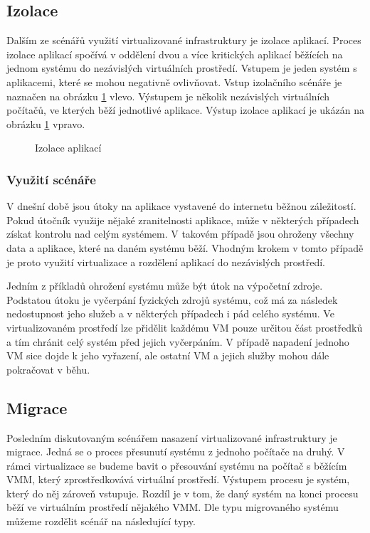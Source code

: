 \subsection{Izolace}

Dalším ze scénářů využití virtualizované infrastruktury je izolace aplikací. Proces izolace aplikací spočívá v oddělení dvou a více kritických aplikací běžících na jednom systému do nezávislých virtuálních prostředí.
Vstupem je jeden systém s aplikacemi, které se mohou negativně ovlivňovat. Vstup izolačního scénáře je naznačen na obrázku \ref{izolation} vlevo. Výstupem je několik nezávislých virtuálních počítačů, ve kterých běží
jednotlivé aplikace. Výstup izolace aplikací je ukázán na obrázku \ref{izolation} vpravo.

\begin{figure}
    \centering    
    \caption{Izolace aplikací}
    \label{izolation}
\end{figure}

\subsubsection*{Využití scénáře}

V dnešní době jsou útoky na aplikace vystavené do internetu běžnou záležitostí. Pokud útočník využije nějaké zranitelnosti aplikace, může v některých případech získat kontrolu nad celým systémem. V takovém případě jsou
ohroženy všechny data a aplikace, které na daném systému běží. Vhodným krokem v tomto případě je proto využití virtualizace a rozdělení aplikací do nezávislých prostředí.

Jedním z příkladů ohrožení systému může být útok na výpočetní zdroje. Podstatou útoku je vyčerpání fyzických zdrojů systému, což má za následek nedostupnost jeho služeb a v některých případech i pád celého systému.
Ve virtualizovaném prostředí lze přidělit každému VM pouze určitou část prostředků a tím chránit celý systém před jejich vyčerpáním. V případě napadení jednoho VM sice dojde k jeho vyřazení, ale ostatní VM a jejich služby
mohou dále pokračovat v běhu.

\subsection{Migrace}

Posledním diskutovaným scénářem nasazení virtualizované infrastruktury je migrace. Jedná se o proces přesunutí systému z jednoho počítače na druhý. V rámci virtualizace se budeme bavit o přesouvání systému na počítač s běžícím VMM,
který zprostředkovává virtuální prostředí. Výstupem procesu je systém, který do něj zároveň vstupuje. Rozdíl je v tom, že daný systém na konci procesu běží ve virtuálním prostředí nějakého VMM. Dle typu migrovaného systému můžeme
rozdělit scénář na následující typy.

